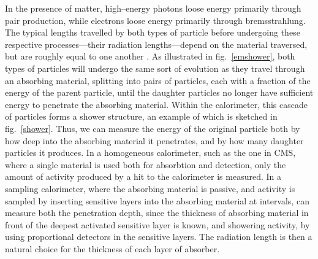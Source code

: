 In the presence of matter, high--energy photons loose energy primarily through pair production, while electrons loose energy primarily through bremsstrahlung. The typical lengths travelled by both types of particle before undergoing these respective processes---their radiation lengths---depend on the material traversed, but are roughly equal to one another \cite{fernow:sampcal}. As illustrated in fig.~\ref{emshower}, both types of particles will undergo the same sort of evolution as they travel through an absorbing material, splitting into pairs of particles, each with a fraction of the energy of the parent particle, until the daughter particles no longer have sufficient energy to penetrate the absorbing material. Within the calorimeter, this cascade of particles forms a shower structure, an example of which is sketched in fig.~\ref{shower}. Thus, we can measure the energy of the original particle both by how deep into the absorbing material it penetrates, and by how many daughter particles it produces. In a homogeneous calorimeter, such as the one in CMS, where a single material is used both for absorbtion and detection, only the amount of activity produced by a hit to the calorimeter is measured. In a sampling calorimeter, where the absorbing material is passive, and activity is sampled by inserting sensitive layers into the absorbing material at intervals, can measure both the penetration depth, since the thickness of absorbing material in front of the deepest activated sensitive layer is known, and showering activity, by using proportional detectors in the sensitive layers. The radiation length is then a natural choice for the thickness of each layer of absorber.

